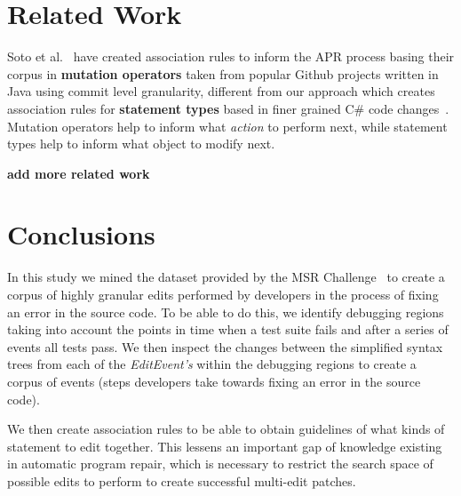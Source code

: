 \documentclass[sigconf]{acmart}
\newcommand{\todo}[1]
  {{\scriptsize \textbf{\color{red} {#1}}}}
\begin{document}
\section{Related Work}
\label{relWork}
Soto et al.~\cite{Soto18} have created association rules to inform the APR
process basing their corpus in \textbf{mutation operators} taken from popular Github projects
written in Java using commit level granularity, 
different from our approach which creates association rules for \textbf{statement types} 
based in finer grained C\# code changes~\cite{msr18challenge}. Mutation operators help to 
inform what \textit{action} to perform next, while statement types help to inform what
object to modify next. 

\todo{add more related work}

\section{Conclusions}
\label{conclusions}
In this study we mined the dataset provided by the MSR Challenge~\cite{msr18challenge}
to create a corpus of highly granular edits performed by developers in the process
of fixing an error in the source code. To be able to do this, we identify debugging
regions taking into account the points in time when a test suite fails and after a 
series of events all tests pass. We then inspect the changes between the simplified 
syntax trees from each
of the \textit{EditEvent's} within the debugging regions to create a corpus of 
events (steps developers take towards fixing an error in the source code).

We then create association rules to be able to obtain guidelines of what kinds of
statement to edit together. This lessens an important gap of knowledge existing
in automatic program repair, which is necessary to restrict the search space of 
possible edits to perform to create successful multi-edit patches.
\end{document}

